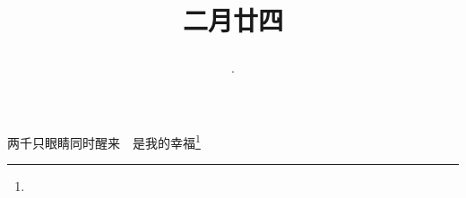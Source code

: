 \title{\date[d=2,m=4,y=2024][year:cn-y,年,month:cn,day:cn,日,·,weekday]·二月廿四 }
两千只眼睛同时醒来　是我的幸福\footnote{ }


